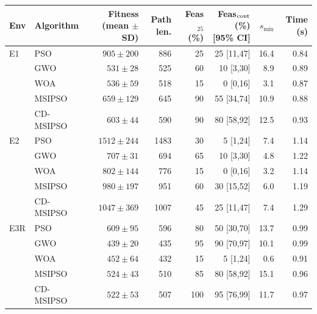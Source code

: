 \begin{tabular}{llrrrrrr}
\hline
Env & Algorithm & Fitness (mean $\pm$ SD) & Path len. & Feas$_{25}$ (\%) & Feas$_{\rm cont}$ (\%) [95\% CI] & $s_{\min}$ & Time (s) \\
\hline
E1 & PSO & $905\pm200$ & 886 & 25 & 25 [11,47] & 16.4 & 0.84 \\
 & GWO & $531\pm28$ & 525 & 60 & 10 [3,30] & 8.9 & 0.89 \\
 & WOA & $536\pm59$ & 518 & 15 & 0 [0,16] & 3.1 & 0.87 \\
 & MSIPSO & $659\pm129$ & 645 & 90 & 55 [34,74] & 10.9 & 0.88 \\
 & CD-MSIPSO & $603\pm44$ & 590 & 90 & 80 [58,92] & 12.5 & 0.93 \\
\hline
E2 & PSO & $1512\pm244$ & 1483 & 30 & 5 [1,24] & 7.4 & 1.14 \\
 & GWO & $707\pm31$ & 694 & 65 & 10 [3,30] & 4.8 & 1.22 \\
 & WOA & $802\pm144$ & 776 & 15 & 0 [0,16] & 3.2 & 1.14 \\
 & MSIPSO & $980\pm197$ & 951 & 60 & 30 [15,52] & 6.0 & 1.19 \\
 & CD-MSIPSO & $1047\pm369$ & 1007 & 45 & 25 [11,47] & 7.4 & 1.29 \\
\hline
E3R & PSO & $609\pm95$ & 596 & 80 & 50 [30,70] & 13.7 & 0.99 \\
 & GWO & $439\pm20$ & 435 & 95 & 90 [70,97] & 10.1 & 0.99 \\
 & WOA & $452\pm64$ & 432 & 15 & 5 [1,24] & 0.6 & 0.91 \\
 & MSIPSO & $524\pm43$ & 510 & 85 & 80 [58,92] & 15.1 & 0.96 \\
 & CD-MSIPSO & $522\pm53$ & 507 & 100 & 95 [76,99] & 11.7 & 0.97 \\
\hline
\end{tabular}